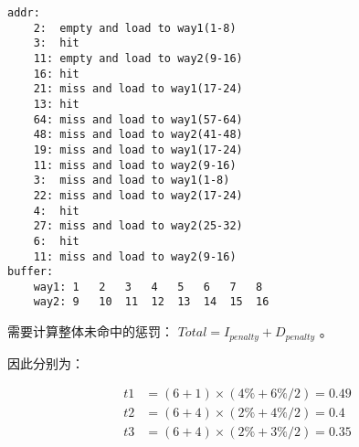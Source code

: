 \documentclass[lang=cn,11pt,a4paper,cite=authoryear]{elegantpaper}
\begin{document}

\begin{lstlisting}
addr:
    2:  empty and load to way1(1-8)
    3:  hit 
    11: empty and load to way2(9-16) 
    16: hit 
    21: miss and load to way1(17-24)
    13: hit
    64: miss and load to way1(57-64)
    48: miss and load to way2(41-48)
    19: miss and load to way1(17-24)
    11: miss and load to way2(9-16)
    3:  miss and load to way1(1-8)
    22: miss and load to way2(17-24)
    4:  hit 
    27: miss and load to way2(25-32)
    6:  hit 
    11: miss and load to way2(9-16)
buffer:  
    way1: 1   2   3   4   5   6   7   8
    way2: 9   10  11  12  13  14  15  16
\end{lstlisting}


需要计算整体未命中的惩罚： \(Total = I_{penalty} + D_{penalty}\) 。

因此分别为：

\[\begin{aligned}
    t1 &= (6 + 1) \times (4\% + 6\% / 2) = 0.49 \\
    t2 &= (6 + 4) \times (2\% + 4\% / 2) = 0.4 \\ 
    t3 &= (6 + 4) \times (2\% + 3\% / 2) = 0.35
\end{aligned}\]


\end{document}
